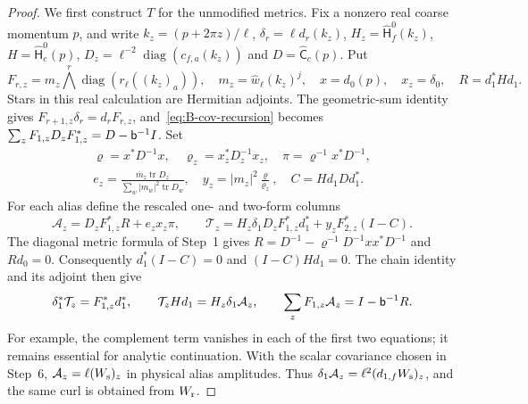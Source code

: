 \begin{proof}
We first construct $T$ for the unmodified metrics. Fix a nonzero real coarse momentum $p$, and write $k_z=(p+2\pi z)/\ell$, $\delta_r=\ell d_r(k_z)$, $H_z=\widehat{\mathsf H}_f^0(k_z)$, $H=\widehat{\mathsf H}_c^0(p)$, $D_z=\ell^{-2}\operatorname{diag}(c_{f,a}(k_z))$ and $D=\widehat{\mathsf C}_c(p)$. Put
\begin{equation*}
F_{r,z}=m_z\bigwedge^r\operatorname{diag}(r_\ell((k_z)_a)),\quad m_z=\widehat w_\ell(k_z)^j,\quad
x=d_0(p),\quad x_z=\delta_0,\quad R=d_1^*Hd_1.
\end{equation*}
Stars in this real calculation are Hermitian adjoints. The geometric-sum identity gives $F_{r+1,z}\delta_r=d_rF_{r,z}$, and~\eqref{eq:B-cov-recursion} becomes $\sum_zF_{1,z}D_zF_{1,z}^*=D-\mathsf{b}^{-1}I$. Set
\begin{gather*}
\varrho=x^*D^{-1}x,\quad \varrho_z=x_z^*D_z^{-1}x_z,\quad
\pi=\varrho^{-1}x^*D^{-1},\\
e_z=\frac{\overline m_z\operatorname{tr}D_z}{\sum_w|m_w|^2\operatorname{tr}D_w},\quad
y_z=|m_z|^2\frac{\varrho}{\varrho_z},\quad C=Hd_1Dd_1^*.
\end{gather*}
For each alias define the rescaled one- and two-form columns
\begin{equation}\label{eq:B-transfer-columns}
\mathcal A_z=D_zF_{1,z}^*R+e_zx_z\pi,\qquad
\mathcal T_z=H_z\delta_1D_zF_{1,z}^*d_1^*+y_zF_{2,z}^*(I-C).
\end{equation}
The diagonal metric formula of Step~1 gives $R=D^{-1}-\varrho^{-1}D^{-1}xx^*D^{-1}$ and $Rd_0=0$. Consequently $d_1^*(I-C)=0$ and $(I-C)Hd_1=0$. The chain identity and its adjoint then give
\begin{equation*}
\delta_1^*\mathcal T_z=F_{1,z}^*d_1^*,\qquad
\mathcal T_zHd_1=H_z\delta_1\mathcal A_z,\qquad
\sum_zF_{1,z}\mathcal A_z=I-\mathsf{b}^{-1}R.
\end{equation*}
For example, the complement term vanishes in each of the first two equations; it remains essential for analytic continuation. With the scalar covariance chosen in Step~6, $\mathcal A_z=\ell(W_{\rm s})_z$ in physical alias amplitudes. Thus $\delta_1\mathcal A_z=\ell^2(d_{1,f}W_{\rm s})_z$, and the same curl is obtained from $W_{\rm r}$.


\end{proof}
